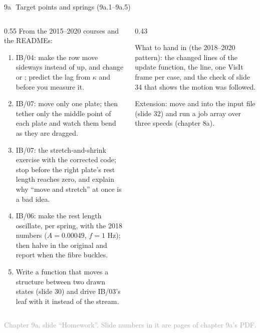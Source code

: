 \documentclass[aspectratio=169,11pt]{beamer}
\newcommand{\sourcecredit}[1]{\vfill\begin{flushright}\tiny\textcolor{DarkGray}{#1}\end{flushright}}
\begin{document}
\begin{frame}{9a\,\textbullet\ Target points and springs (9a.1--9a.5)}
\label{fr:c9ax1}
\begin{columns}[T,onlytextwidth]
\begin{column}{0.55\textwidth}
\scriptsize From the 2015--2020 courses and the READMEs:
\begin{enumerate}
  \item[9a.1] IB/04: make the row move sideways instead of up, and change  or ; predict the lag from $\kappa$ and  before you measure it.
  \item[9a.2] IB/07: move only one plate; then tether only the middle point of each plate and watch them bend as they are dragged.
  \item[9a.3] IB/07: the stretch-and-shrink exercise with the corrected code; stop before the right plate's rest length reaches zero, and explain why ``move and stretch'' at once is a bad idea.
  \item[9a.4] IB/06: make the rest length oscillate,  per spring, with the 2018 numbers ($A = 0.00049$, $f = 1$ Hz); then halve  in the original and report when the fibre buckles.
  \item[9a.5] Write a function that moves a structure between two drawn states (slide 30) and drive IB/03's leaf with it instead of the stream.
\end{enumerate}
\end{column}
\begin{column}{0.43\textwidth}
\begin{punchbox}
\scriptsize What to hand in (the 2018--2020 pattern): the changed lines of the update function, the  line, one VisIt frame per case, and the check of slide 34 that shows the motion was followed.
\end{punchbox}
\scriptsize {} Extension: move  and  into the input file (slide 32) and run a job array over three speeds (chapter 8a).
\end{column}
\end{columns}
\sourcecredit{Chapter 9a, slide ``Homework''. Slide numbers in it are pages of chapter 9a's PDF.}
\end{frame}
\end{document}

